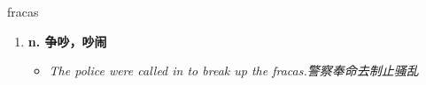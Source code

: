 
\begin{frame}
{\huge fracas}
\begin{center}
\begin{enumerate}\Large
  \item \textbf{n. 争吵，吵闹}
  \begin{itemize}
    \item \em{\Large{The police were called in to break up the fracas.警察奉命去制止骚乱}}
  \end{itemize}
\end{enumerate}
\end{center}
\end{frame}
